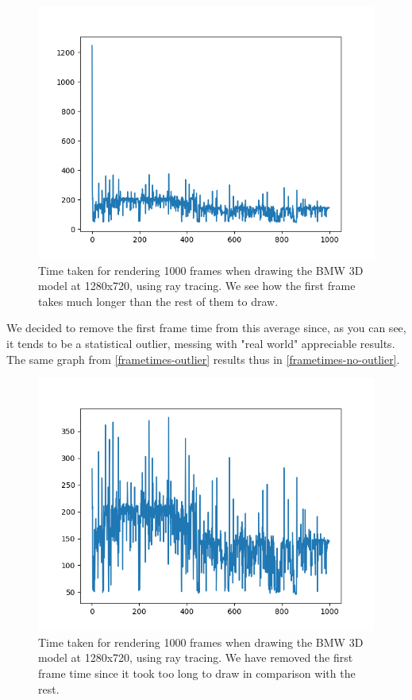 \begin{figure}[hbt!]
    \centering
    \includegraphics[width=1.0\textwidth]{figuras/frametime-outlier.png}
    \caption{Time taken for rendering 1000 frames when drawing the BMW 3D model at 1280x720, using ray tracing. We see how the first frame takes much longer than the rest of them to draw.}
    \label{frametimes-outlier-graph}
\end{figure}

We decided to remove the first frame time from this average since, as you can see, it tends to be a statistical outlier, messing with "real world" appreciable results. The same graph from \ref{frametimes-outlier} results thus in \ref{frametimes-no-outlier}.

\begin{figure}[hbt!]
    \centering
    \includegraphics[width=1.0\textwidth]{figuras/frametime-no-outlier.png}
    \caption{Time taken for rendering 1000 frames when drawing the BMW 3D model at 1280x720, using ray tracing. We have removed the first frame time since it took too long to draw in comparison with the rest.}
    \label{frametimes-no-outlier-graph}
\end{figure}


